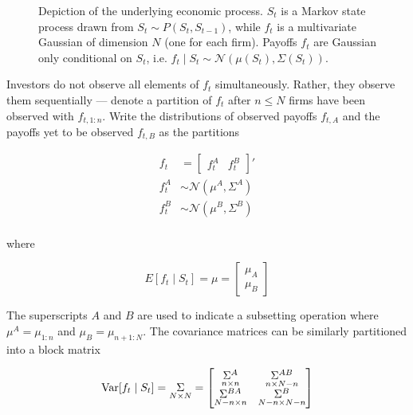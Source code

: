 \documentclass{article}
\begin{document}
\begin{figure}
\begin{tikzpicture}


\end{tikzpicture}
\caption{
    Depiction of the underlying economic process. $S_t$ is a Markov state process drawn from $S_t \sim P(S_t, S_{t-1})$, while $f_t$ is a multivariate Gaussian of dimension $N$ (one for each firm). Payoffs $f_t$ are Gaussian only conditional on $S_t$, i.e. $f_t \mid S_t \sim \mathcal{N}(\mu(S_t), \Sigma(S_t))$.
}
\end{figure}

Investors do not observe all elements of $f_t$ simultaneously. Rather, they observe them sequentially --- denote a partition of $f_t$ after $n \le N$ firms have been observed with $f_{t,1:n}$. Write the distributions of observed payoffs $f_{t,A}$ and the payoffs yet to be observed $f_{t,B}$ as the partitions

\begin{align*}
    f_t &= \begin{bmatrix}
        f^A_t & f^B_t
    \end{bmatrix}' \\ 
    f^A_{t} &\sim \mathcal{N}(\mu^A, \Sigma^A) \\
    f^B_{t} &\sim \mathcal{N}(\mu^B, \Sigma^B) \\
\end{align*}

\noindent where 

$$
E[f_t \mid S_t] = \mu = \begin{bmatrix}
    \mu_A \\
    \mu_B
\end{bmatrix}
$$

The superscripts $A$ and $B$ are used to indicate a subsetting operation where $\mu^A = \mu_{1:n}$ and $\mu_B = \mu_{n+1:N}$. The covariance matrices can be similarly partitioned into a block matrix

$$
\Var[f_t \mid S_t] = \underset{N \times N}{\Sigma} = \begin{bmatrix}
    \underset{n\times n}{\Sigma^A} & \underset{n\times N-n}{\Sigma^{AB}} \\
    \underset{N-n\times n}{\Sigma^{BA}} & \underset{N-n\times N-n}{\Sigma^B} \\
\end{bmatrix}
$$
\end{document}

